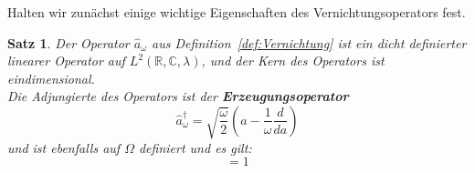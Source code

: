 \documentclass[11pt,a4paper,leqno]{report}
\newtheorem{proposition}{Satz}[chapter]
\numberwithin{equation}{chapter}
\begin{document}
\noindent
Halten wir zun\"achst einige wichtige Eigenschaften des 
Vernichtungsoperators fest.
\begin{proposition}\label{thm:vernicht_erzeug}
	Der Operator $\hat{a}_\omega$ aus Definition~\ref{def:Vernichtung} ist ein dicht definierter linearer Operator auf $L^2(\mathbb{R}, \mathbb{C},\lambda)$, und der Kern des Operators ist eindimensional.\\
	Die Adjungierte des Operators ist der \textbf{Erzeugungsoperator}
	\begin{equation}
		\hat{a}_\omega^\dagger = \sqrt{\frac{\omega}{2}}(a - \frac{1}{\omega}\frac{d}{da})\label{eq:erzeuger}
	\end{equation}
	und ist ebenfalls auf $\Omega$ definiert und es gilt:
	\begin{equation}
		[\hat{a}_\omega, \hat{a}_\omega^\dagger] = 1
	\end{equation}
\end{proposition}
\end{document}
